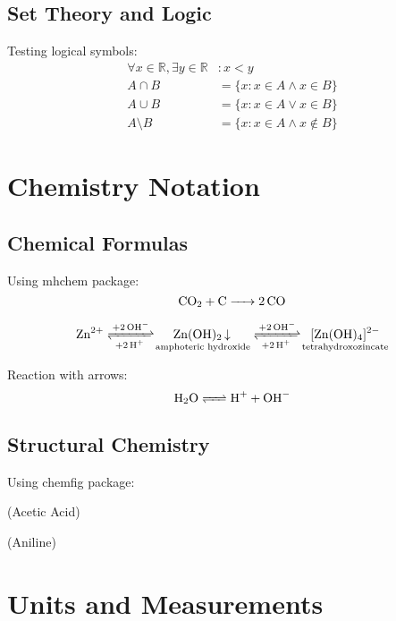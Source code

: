\documentclass[11pt,a4paper]{article}
\theoremstyle{definition}
\begin{document}
\subsection{Set Theory and Logic}

Testing logical symbols:
\begin{align}
    \forall x \in \mathbb{R}, \exists y \in \mathbb{R} &: x < y \\
    A \cap B &= \{x : x \in A \land x \in B\} \\
    A \cup B &= \{x : x \in A \lor x \in B\} \\
    A \setminus B &= \{x : x \in A \land x \notin B\}
\end{align}

\section{Chemistry Notation}

\subsection{Chemical Formulas}

Using mhchem package:
\begin{equation}
    \ce{CO2 + C -> 2CO}
\end{equation}

\begin{equation}
    \ce{Zn^2+ <=>[+ 2OH-][+ 2H+] $\underset{\text{amphoteric hydroxide}}{\ce{Zn(OH)2 v}}$ <=>[+ 2OH-][+ 2H+] $\underset{\text{tetrahydroxozincate}}{\ce{[Zn(OH)4]^2-}}$}
\end{equation}

Reaction with arrows:
\begin{equation}
    \ce{H2O <=> H+ + OH-}
\end{equation}

\subsection{Structural Chemistry}

Using chemfig package:
\begin{center}
\quad (Acetic Acid)
\end{center}

\begin{center}
\quad (Aniline)
\end{center}

\section{Units and Measurements}
\end{document}
